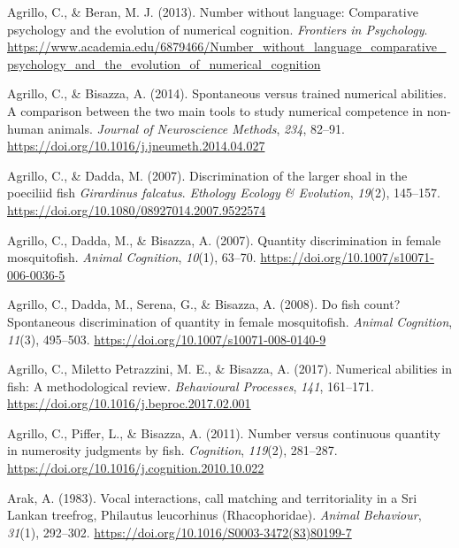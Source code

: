 \documentclass[
  ,pub,floatsintext]{apa6}
\newlength{\cslhangindent}
\newlength{\cslentryspacingunit} %
\newenvironment{CSLReferences}[2] %
 {%
  \setlength{\parindent}{0pt}
  \ifodd #1
  \let\oldpar\par
  \def\par{\hangindent=\cslhangindent\oldpar}
  \fi
  \setlength{\parskip}{#2\cslentryspacingunit}
 }%
 {}
\begin{document}
\hypertarget{refs}{}
\begin{CSLReferences}{1}{0}
\leavevmode{}%
Agrillo, C., \& Beran, M. J. (2013). Number without language: Comparative psychology and the evolution of numerical cognition. \emph{Frontiers in Psychology}. \url{https://www.academia.edu/6879466/Number_without_language_comparative_psychology_and_the_evolution_of_numerical_cognition}

\leavevmode{}%
Agrillo, C., \& Bisazza, A. (2014). Spontaneous versus trained numerical abilities. {A} comparison between the two main tools to study numerical competence in non-human animals. \emph{Journal of Neuroscience Methods}, \emph{234}, 82--91. \url{https://doi.org/10.1016/j.jneumeth.2014.04.027}

\leavevmode{}%
Agrillo, C., \& Dadda, M. (2007). Discrimination of the larger shoal in the poeciliid fish \emph{{Girardinus} falcatus}. \emph{Ethology Ecology \& Evolution}, \emph{19}(2), 145--157. \url{https://doi.org/10.1080/08927014.2007.9522574}

\leavevmode{}%
Agrillo, C., Dadda, M., \& Bisazza, A. (2007). Quantity discrimination in female mosquitofish. \emph{Animal Cognition}, \emph{10}(1), 63--70. \url{https://doi.org/10.1007/s10071-006-0036-5}

\leavevmode{}%
Agrillo, C., Dadda, M., Serena, G., \& Bisazza, A. (2008). Do fish count? {Spontaneous} discrimination of quantity in female mosquitofish. \emph{Animal Cognition}, \emph{11}(3), 495--503. \url{https://doi.org/10.1007/s10071-008-0140-9}

\leavevmode{}%
Agrillo, C., Miletto Petrazzini, M. E., \& Bisazza, A. (2017). Numerical abilities in fish: {A} methodological review. \emph{Behavioural Processes}, \emph{141}, 161--171. \url{https://doi.org/10.1016/j.beproc.2017.02.001}

\leavevmode{}%
Agrillo, C., Piffer, L., \& Bisazza, A. (2011). Number versus continuous quantity in numerosity judgments by fish. \emph{Cognition}, \emph{119}(2), 281--287. \url{https://doi.org/10.1016/j.cognition.2010.10.022}

\leavevmode{}%
Arak, A. (1983). Vocal interactions, call matching and territoriality in a {Sri Lankan} treefrog, {Philautus} leucorhinus ({Rhacophoridae}). \emph{Animal Behaviour}, \emph{31}(1), 292--302. \url{https://doi.org/10.1016/S0003-3472(83)80199-7}


\end{CSLReferences}
\end{document}
